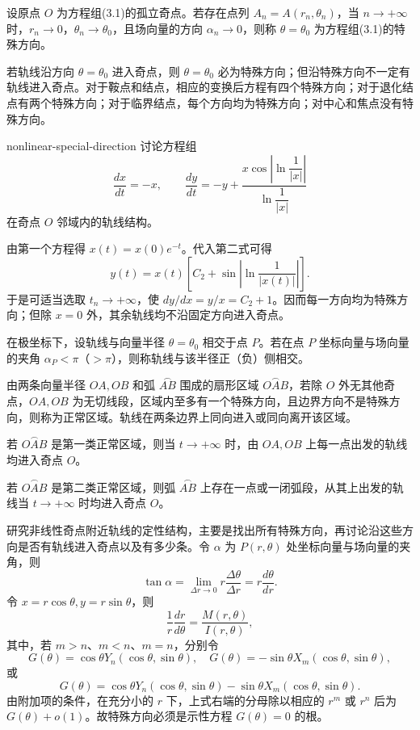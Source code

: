 \begin{definition}{}{}
设原点 $O$ 为方程组(3.1)的孤立奇点。若存在点列 $A_n=A(r_n,\theta_n)$，当 $n\to+\infty$ 时，$r_n\to0$，$\theta_n\to\theta_0$，且场向量的方向 $\alpha_n\to0$，则称 $\theta=\theta_0$ 为方程组(3.1)的特殊方向。
\end{definition}

若轨线沿方向 $\theta=\theta_0$ 进入奇点，则 $\theta=\theta_0$ 必为特殊方向；但沿特殊方向不一定有轨线进入奇点。对于鞍点和结点，相应的变换后方程有四个特殊方向；对于退化结点有两个特殊方向；对于临界结点，每个方向均为特殊方向；对中心和焦点没有特殊方向。

\begin{example}{}{nonlinear-special-direction}
讨论方程组
\[
\dfrac{dx}{dt}=-x,\qquad
\dfrac{dy}{dt}=-y+
\dfrac{x\cos\left|\ln\dfrac1{|x|}\right|}{\ln\dfrac1{|x|}}
\]
在奇点 $O$ 邻域内的轨线结构。
\end{example}
由第一个方程得 $x(t)=x(0)e^{-t}$。代入第二式可得
\[
y(t)=x(t)\left[C_2+\sin\left|\ln\dfrac1{|x(t)|}\right|\right].
\]
于是可适当选取 $t_n\to+\infty$，使 $dy/dx=y/x=C_2+1$。因而每一方向均为特殊方向；但除 $x=0$ 外，其余轨线均不沿固定方向进入奇点。


在极坐标下，设轨线与向量半径 $\theta=\theta_0$ 相交于点 $P$。若在点 $P$ 坐标向量与场向量的夹角 $\alpha_P<\pi$（$>\pi$），则称轨线与该半径正（负）侧相交。


由两条向量半径 $OA,OB$ 和弧 $\overset{\frown}{AB}$ 围成的扇形区域 $\overset{\frown}{OAB}$，若除 $O$ 外无其他奇点，$OA,OB$ 为无切线段，区域内至多有一个特殊方向，且边界方向不是特殊方向，则称为正常区域。轨线在两条边界上同向进入或同向离开该区域。


\begin{proposition}{}{}
若 $\overset{\frown}{OAB}$ 是第一类正常区域，则当 $t\to+\infty$ 时，由 $OA,OB$ 上每一点出发的轨线均进入奇点 $O$。
\end{proposition}

\begin{proposition}{}{}
若 $\overset{\frown}{OAB}$ 是第二类正常区域，则弧 $\overset{\frown}{AB}$ 上存在一点或一闭弧段，从其上出发的轨线当 $t\to+\infty$ 时均进入奇点 $O$。
\end{proposition}

研究非线性奇点附近轨线的定性结构，主要是找出所有特殊方向，再讨论沿这些方向是否有轨线进入奇点以及有多少条。令 $\alpha$ 为 $P(r,\theta)$ 处坐标向量与场向量的夹角，则
\[
\tan\alpha=\lim_{\Delta r\to0}r\dfrac{\Delta\theta}{\Delta r}
=r\dfrac{d\theta}{dr}.\tag{3.4}
\]
令 $x=r\cos\theta,y=r\sin\theta$，则
\[
\dfrac1r\dfrac{dr}{d\theta}=\dfrac{M(r,\theta)}{I(r,\theta)},\tag{3.5}
\]
其中，若 $m>n$、$m<n$、$m=n$，分别令
\[
G(\theta)=\cos\theta Y_n(\cos\theta,\sin\theta),\quad
G(\theta)=-\sin\theta X_m(\cos\theta,\sin\theta),
\]
或
\[
G(\theta)=\cos\theta Y_n(\cos\theta,\sin\theta)-\sin\theta X_m(\cos\theta,\sin\theta).\tag{3.6}
\]
由附加项的条件，在充分小的 $r$ 下，上式右端的分母除以相应的 $r^m$ 或 $r^n$ 后为 $G(\theta)+o(1)$。故特殊方向必须是示性方程 $G(\theta)=0$ 的根。

